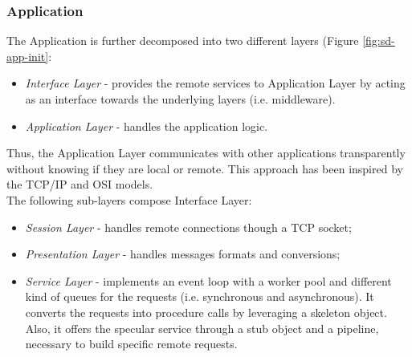 \subsubsection{Application}
The Application is further decomposed into two different layers
(Figure \ref{fig:sd-app-init}:
\begin{itemize}
	\item \textit{Interface Layer} - provides the remote services to Application Layer by acting as an interface
 towards the underlying layers (i.e. middleware).
	\item \textit{Application Layer} - handles the application logic.
\end{itemize}
Thus, the Application Layer communicates with
other applications transparently without knowing if they are local or remote.
This approach has been inspired by the TCP/IP and OSI models.
\\
The following sub-layers compose Interface Layer:
\begin{itemize}
	\item \textit{Session Layer} -
	handles remote connections though a TCP socket;
	\item \textit{Presentation Layer} -
	handles messages formats and conversions;
	\item \textit{Service Layer} -
	implements an event loop with a worker pool and different kind of queues
	for the requests (i.e. synchronous and asynchronous). It converts the
	requests into procedure calls by leveraging a skeleton object.
	Also, it offers the specular service through a stub object and a pipeline,
	necessary to build specific remote requests.
\end{itemize}



